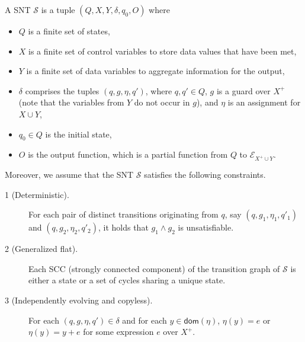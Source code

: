 \documentclass[runningheads,a4paper]{llncs}
\def\Ee{{\mathcal{E} }}
\def\Ss{{\mathcal{S} }}
\newcommand\dom{\mathsf{dom}}
\begin{document}
A SNT $\Ss$ is a tuple $(Q, X, Y, \delta, q_0, O)$ where 
\begin{itemize}
\item $Q$ is a finite set of states,
%
\item $X$ is a finite set of control variables to store data values that have been met,
%
\item $Y$ is a finite set of data variables to aggregate information for the output,
%
\item $\delta$ comprises the tuples $(q,  g, \eta, q')$, where $q,q'\in Q$, $g$ is a guard over $X^+$ (note that the variables from $Y$ do not occur in $g$), and $\eta$ is an assignment for $X \cup Y$, 
%
\item $q_0 \in Q$ is the initial state,
%
\item $O$ is the output function, which is a partial function from $Q$ to $\Ee_{X^+ \cup Y}$.
\end{itemize}
Moreover, we assume that the SNT $\Ss$ satisfies the following constraints.
\begin{description}
\item [1 (Deterministic).] For each pair of distinct transitions originating from $q$, say $(q, g_1, \eta_1,q'_1)$ and $(q, g_2,\eta_2,q'_2)$, it holds that $g_1 \wedge g_2$ is unsatisfiable.
%
\item [2 (Generalized flat).] Each SCC (strongly connected component) of the transition graph of $\Ss$ is either a state or a set of cycles sharing a unique state.
%
%
\item[3 (Independently evolving and copyless).] For each $(q, g, \eta, q') \in \delta$ and for each $y \in \dom(\eta)$, $\eta(y)=e$ or $\eta(y)=y+e$ for some expression $e$ over $X^+$.
%
\end{description}
\end{document}
